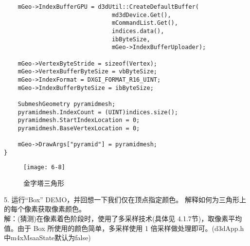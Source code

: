 \begin{lstlisting}
    mGeo->IndexBufferGPU = d3dUtil::CreateDefaultBuffer(
                               md3dDevice.Get(),
                               mCommandList.Get(), 
                               indices.data(), 
                               ibByteSize, 
                               mGeo->IndexBufferUploader);

    mGeo->VertexByteStride = sizeof(Vertex);
    mGeo->VertexBufferByteSize = vbByteSize;
    mGeo->IndexFormat = DXGI_FORMAT_R16_UINT;
    mGeo->IndexBufferByteSize = ibByteSize;

    SubmeshGeometry pyramidmesh;
    pyramidmesh.IndexCount = (UINT)indices.size();
    pyramidmesh.StartIndexLocation = 0;
    pyramidmesh.BaseVertexLocation = 0;

    mGeo->DrawArgs["pyramid"] = pyramidmesh;
}
\end{lstlisting}

\begin{figure}[h]
    \texttt{[image: 6-8]}
    \centering
    \caption{金字塔三角形}
    \label{fig:6-8}
\end{figure}
\begin{flushleft}
5. 运行“Box” DEMO，并回想一下我们仅在顶点指定颜色。 解释如何为三角形上的每个像素获取像素颜色。\\
解：(猜测)在像素着色阶段时，使用了多采样技术(具体见 4.1.7节)，取像素平均值。由于 Box 所使用的颜色简单，多采样使用 1 倍采样做处理即可。(d3dApp.h中m4xMsaaState默认为false)
\end{flushleft}

